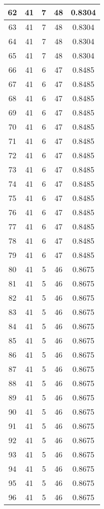\documentclass[letterpaper, 12pt]{article}
\begin{document}
\begin{longtable}{|c|c|c|c|c|}
\hline
62 & 41 & 7 & 48 & 0.8304 \\
\hline
63 & 41 & 7 & 48 & 0.8304 \\
\hline
64 & 41 & 7 & 48 & 0.8304 \\
\hline
65 & 41 & 7 & 48 & 0.8304 \\
\hline
66 & 41 & 6 & 47 & 0.8485 \\
\hline
67 & 41 & 6 & 47 & 0.8485 \\
\hline
68 & 41 & 6 & 47 & 0.8485 \\
\hline
69 & 41 & 6 & 47 & 0.8485 \\
\hline
70 & 41 & 6 & 47 & 0.8485 \\
\hline
71 & 41 & 6 & 47 & 0.8485 \\
\hline
72 & 41 & 6 & 47 & 0.8485 \\
\hline
73 & 41 & 6 & 47 & 0.8485 \\
\hline
74 & 41 & 6 & 47 & 0.8485 \\
\hline
75 & 41 & 6 & 47 & 0.8485 \\
\hline
76 & 41 & 6 & 47 & 0.8485 \\
\hline
77 & 41 & 6 & 47 & 0.8485 \\
\hline
78 & 41 & 6 & 47 & 0.8485 \\
\hline
79 & 41 & 6 & 47 & 0.8485 \\
\hline
80 & 41 & 5 & 46 & 0.8675 \\
\hline
81 & 41 & 5 & 46 & 0.8675 \\
\hline
82 & 41 & 5 & 46 & 0.8675 \\
\hline
83 & 41 & 5 & 46 & 0.8675 \\
\hline
84 & 41 & 5 & 46 & 0.8675 \\
\hline
85 & 41 & 5 & 46 & 0.8675 \\
\hline
86 & 41 & 5 & 46 & 0.8675 \\
\hline
87 & 41 & 5 & 46 & 0.8675 \\
\hline
88 & 41 & 5 & 46 & 0.8675 \\
\hline
89 & 41 & 5 & 46 & 0.8675 \\
\hline
90 & 41 & 5 & 46 & 0.8675 \\
\hline
91 & 41 & 5 & 46 & 0.8675 \\
\hline
92 & 41 & 5 & 46 & 0.8675 \\
\hline
93 & 41 & 5 & 46 & 0.8675 \\
\hline
94 & 41 & 5 & 46 & 0.8675 \\
\hline
95 & 41 & 5 & 46 & 0.8675 \\
\hline
96 & 41 & 5 & 46 & 0.8675 \\

\end{longtable}
\end{document}
